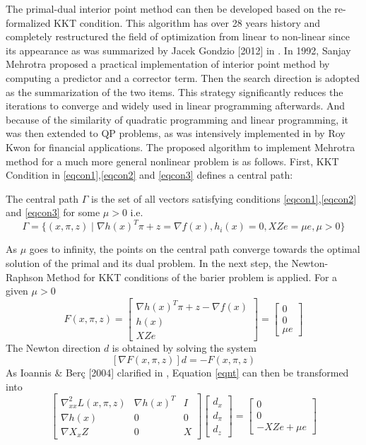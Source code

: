 The primal-dual interior point method can then be developed based on the re-formalized KKT condition. This algorithm has over 28 years history and completely restructured the field of optimization from linear to non-linear since its appearance as was summarized by {\sc Jacek Gondzio} [2012] in \cite{Jacek}.
In 1992, {\sc Sanjay Mehrotra} \cite{Mehrotra} proposed a practical implementation of interior point method by computing a predictor and a corrector term. Then the search direction is adopted as the summarization of the two items. This strategy significantly reduces the iterations to converge and widely used in linear programming afterwards. And because of the similarity of quadratic programming and linear programming, it was then extended to QP problems, as was intensively implemented in \cite{Kwon} by {\sc Roy Kwon}  for financial applications. 
The proposed algorithm to implement Mehrotra method for a much more general nonlinear problem is as follows. First, KKT Condition in \eqref{eqcon1},\eqref{eqcon2} and \eqref{eqcon3} defines a central path:
\begin{defn}
	The central path $\Gamma$ is the set of all vectors satisfying conditions \eqref{eqcon1},\eqref{eqcon2} and \eqref{eqcon3} for some $\mu>0$ i.e.
	$$
	\Gamma=\{(x,\pi,z)\mid \nabla {h(x)}^T \pi+z=\nabla f(x), h_i(x)=0, XZe=\mu e, \mu>0\}
	$$
\end{defn}
As $\mu$ goes to infinity, the points on the central path converge towards the optimal solution of the primal and its dual problem. In the next step, the Newton-Raphson Method for KKT conditions of the barier problem is applied. For a given $\mu>0$
\begin{equation}
F(x,\pi,z)=
\begin{bmatrix}
\nabla {h(x)}^T \pi+z-\nabla f(x)\\
h(x)\\
XZe
\end{bmatrix}
=
\begin{bmatrix}
0\\
0\\
\mu e
\end{bmatrix}
\end{equation}
The Newton direction $d$ is obtained by solving the system
\begin{equation}\label{eqnt}
[\nabla F(x,\pi,z)]d=-F(x,\pi,z)
\end{equation}
As {\sc Ioannis \& Ber\c{c}} [2004] clarified in \cite{ioannis}, Equation \eqref{eqnt} can then be transformed into
\begin{equation}\label{eqnt2}
\begin{bmatrix}
\nabla^2_{xx} L(x,\pi,z) & \nabla h(x)^T & I\\
\nabla h(x) & 0 & 0\\
\nabla X_xZ & 0 & X
\end{bmatrix}
\begin{bmatrix}
d_x\\
d_\pi\\
d_z
\end{bmatrix}
=
\begin{bmatrix}
0\\
0\\
-XZe+\mu e
\end{bmatrix}
\end{equation}
